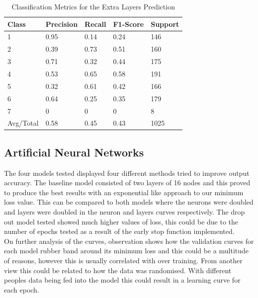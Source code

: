 \documentclass[11pt]{article}
\begin{document}
	
	\begin{table}[H]
		\centering
		\caption{Classification Metrics for the Extra Layers Prediction}
		\begin{tabular}{l|llll}
			Class     & Precision & Recall & F1-Score & Support \\\hline
			1         & 0.95      & 0.14   & 0.24     & 146     \\
			2         & 0.39      & 0.73   & 0.51     & 160     \\
			3         & 0.71      & 0.32   & 0.44     & 175     \\
			4         & 0.53      & 0.65   & 0.58     & 191     \\
			5         & 0.32      & 0.61   & 0.42     & 166     \\
			6         & 0.64      & 0.25   & 0.35     & 179     \\
			7         & 0         & 0      & 0        & 8       \\
			Avg/Total & 0.58      & 0.45   & 0.43     & 1025   \\\hline\hline
		\end{tabular}
	\end{table}
	
	

	
	
	
	\subsection{Artificial Neural Networks}
	The four models tested displayed four different methods tried to improve output accuracy. The baseline model consisted of two layers of 16 nodes and this proved to produce the best results with an exponential like approach to our minimum loss value. This can be compared to both models where the neurons were doubled and layers were doubled in the neuron and layers curves respectively. The drop out model tested showed much higher values of loss, this could be due to the number of epochs tested as a result of the early stop function implemented.\\
	
	\noindent
	On further analysis of the curves, observation shows how the validation curves for each model rubber band around its minimum loss and this could be a multitude of reasons, however this is usually correlated with over training. From another view this could be related to how the data was randomised. With different peoples data being fed into the model this could result in a learning curve for each epoch.
	
\end{document}
